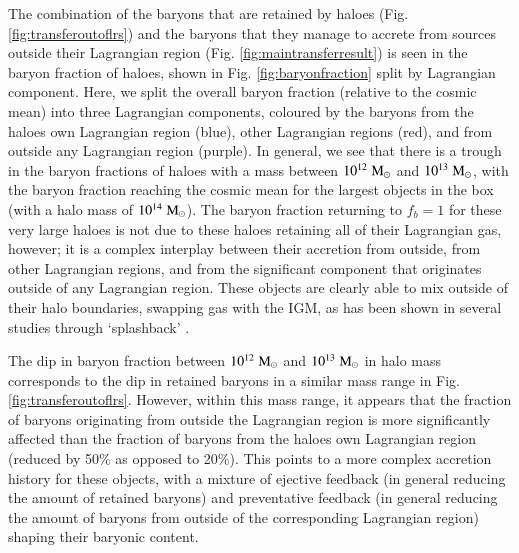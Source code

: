 The combination of the baryons that are retained by haloes (Fig.
\ref{fig:transferoutoflrs}) and the baryons that they manage to accrete from
sources outside their Lagrangian region (Fig. \ref{fig:maintransferresult})
is seen in the baryon fraction of haloes, shown in Fig.
\ref{fig:baryonfraction} split by Lagrangian component. Here, we split the
overall baryon fraction (relative to the cosmic mean) into three Lagrangian
components, coloured by the baryons from the haloes own Lagrangian region
(blue), other Lagrangian regions (red), and from outside any Lagrangian
region (purple). In general, we see that there is a trough in the baryon
fractions of haloes with a mass between $10^{12}\;{\rm M}_{\odot}{}$ and
$10^{13}\;{\rm M}_{\odot}{}$, with the baryon fraction reaching the cosmic mean for the
largest objects in the box (with a halo mass of $10^{14}\;{\rm M}_{\odot}{}$). The
baryon fraction returning to $f_b = 1$ for these very large haloes is not due
to these haloes retaining all of their Lagrangian gas, however; it is a
complex interplay between their accretion from outside, from other Lagrangian
regions, and from the significant component that originates outside of any
Lagrangian region. These objects are clearly able to mix outside of their
halo boundaries, swapping gas with the IGM, as has been shown in several
studies through `splashback' \citep{Mansfield2017, Diemer2017}.

The dip in baryon fraction between $10^{12}\;{\rm M}_{\odot}{}$ and $10^{13}\;{\rm M}_{\odot}{}$ in halo
mass corresponds to the dip in retained baryons in a similar mass range in
Fig. \ref{fig:transferoutoflrs}. However, within this mass range, it appears
that the fraction of baryons originating from outside the Lagrangian region is
more significantly affected than the fraction of baryons from the haloes own
Lagrangian region (reduced by 50\% as opposed to 20\%). This points
to a more complex accretion history for these objects, with a mixture of
ejective feedback (in general reducing the amount of retained baryons) and preventative
feedback (in general reducing the amount of baryons from outside of the
corresponding Lagrangian region) shaping their baryonic content.


